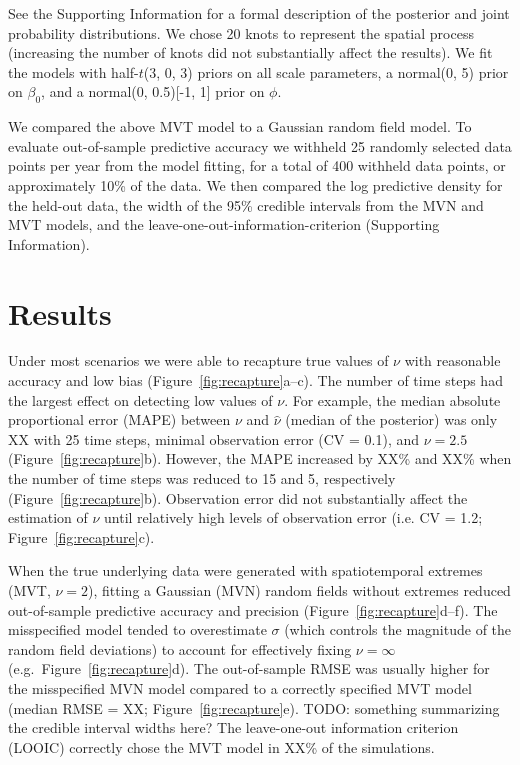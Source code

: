 \documentclass[12pt,english]{article}
\begin{document}
\begin{spacing}{1.9}
See the Supporting Information for a formal description
of the posterior and joint
probability distributions.
We chose 20 knots to represent the spatial process
(increasing the number of knots did not substantially affect the results).
We fit the models with half-$t$(3, 0, 3) priors on all
scale parameters,
a normal(0, 5) prior on $\beta_0$,
and a normal(0, 0.5)[-1, 1] prior on $\phi$.

We compared the above MVT
model to a Gaussian random field model.
To evaluate out-of-sample predictive accuracy we withheld
25 randomly selected data points
per year from the model fitting,
for a total of 400 withheld data points,
or approximately 10\% of the data.
We then compared the log predictive density for the held-out data,
the width of the 95\% credible intervals
from the MVN and MVT models, and
the leave-one-out-information-criterion (Supporting Information).

\section{Results}

Under most scenarios we were able to recapture true values of $\nu$ with
reasonable accuracy and low bias (Figure~\ref{fig:recapture}a--c). The
number of time steps had the largest effect on detecting low values
of $\nu$. For example, the median absolute proportional error (MAPE) between
$\nu$ and $\hat{\nu}$ (median of the posterior) was only XX with 25 time steps,
minimal observation error (CV = 0.1), and $\nu = 2.5$
(Figure~\ref{fig:recapture}b). However, the MAPE increased by XX\% and XX\% when
the number of time steps was reduced to 15 and 5, respectively
(Figure~\ref{fig:recapture}b). Observation error did not substantially affect
the estimation of $\nu$ until relatively high levels of observation error
(i.e. CV = 1.2; Figure~\ref{fig:recapture}c).

When the true underlying data were generated with spatiotemporal extremes (MVT,
$\nu = 2$), fitting a Gaussian (MVN) random fields without extremes
reduced out-of-sample predictive accuracy and precision
(Figure~\ref{fig:recapture}d--f). The misspecified model tended to overestimate
$\sigma$ (which controls the magnitude of the random field deviations) to
account for effectively fixing $\nu = \infty$ (e.g.\ Figure~\ref{fig:recapture}d). The
out-of-sample RMSE was usually higher for the misspecified MVN model compared to
a correctly specified MVT model (median RMSE = XX; Figure~\ref{fig:recapture}e).
TODO: something summarizing the credible interval widths here? The leave-one-out
information criterion (LOOIC) correctly chose the MVT model in XX\% of the
simulations.


\end{spacing}
\end{document}
